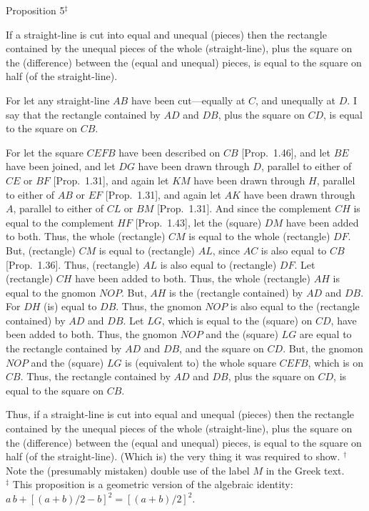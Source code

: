 
\begin{center}
{\large Proposition 5$^\ddag$}
\end{center}

If a straight-line is cut into equal and unequal (pieces) then the rectangle contained by the
unequal pieces of the whole (straight-line), plus the square on the (difference) between the (equal and unequal)
pieces, is equal to the square on  half (of the straight-line).

\epsfysize=1.8in
\centerline{}

For let any straight-line $AB$ have been cut---equally at $C$, and unequally at $D$.
I say that the rectangle contained by $AD$ and $DB$, plus the square
on $CD$, is equal to the square on $CB$.

For let the square $CEFB$ have been described on $CB$ [Prop.~1.46], and
let $BE$ have been joined,
and let $DG$ have
been drawn through $D$, parallel to either of $CE$ or $BF$ [Prop.~1.31], and again let $KM$
have been drawn through $H$, parallel to either of $AB$ or $EF$ [Prop.~1.31], and again let
$AK$ have been drawn through $A$, parallel to either of $CL$ or $BM$ [Prop.~1.31].
And since the complement $CH$ is equal to the complement $HF$ [Prop.~1.43],
let the (square) $DM$ have been added to both. Thus, the whole (rectangle) $CM$ is equal to the whole (rectangle) $DF$. But, (rectangle) $CM$ is equal to (rectangle) $AL$, since $AC$ is
also equal to $CB$ [Prop.~1.36]. Thus, (rectangle) $AL$ is also equal to (rectangle) $DF$.
Let (rectangle) $CH$ have been added to both. Thus, the whole (rectangle)
$AH$ is equal to the gnomon $NOP$. But,  $AH$ is the (rectangle
contained) by $AD$ and $DB$. For $DH$ (is) equal to $DB$. Thus, the
gnomon $NOP$ is also equal to the (rectangle contained) by $AD$ and $DB$. Let
$LG$, which is equal to the (square) on $CD$,  have been added to both.
Thus, the gnomon $NOP$ and the (square) $LG$ are equal to the rectangle contained by
$AD$ and $DB$, and the square on $CD$. But, the gnomon $NOP$ and
the (square) $LG$ is (equivalent to) the whole square $CEFB$, which is on $CB$. Thus, the rectangle contained
by $AD$ and $DB$, plus the square on $CD$, is equal to the square on $CB$.

Thus, if a straight-line is cut into equal and unequal (pieces) then the rectangle contained by the
unequal pieces of the whole  (straight-line), plus the square on the (difference) between the (equal and unequal)
pieces, is equal to the square on  half (of the straight-line). (Which is) the
very thing it was required to show.
{\footnotesize \noindent$^\dag$ Note the (presumably mistaken) double use of the label $M$ in the Greek text.\\[0.5ex]
$^\ddag$ This proposition is a geometric version
of the algebraic identity: $a\,b +[(a+b)/2-b]^2 = [(a+b)/2]^2$.}


